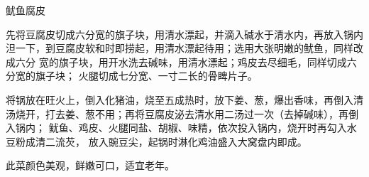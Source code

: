 \begin{recipe}{鱿鱼腐皮}

\ingredients


\preparation

\step 先将豆腐皮切成六分宽的旗子块，用清水漂起，并滴入碱水于清水内，再放入锅内
泹一下，到豆腐皮软和时即捞起，用清水漂起待用；选用大张明嫩的鱿鱼，同样改成六分
宽的旗子块，用开水洗去碱味，用清水漂起；鸡皮去尽细毛，同样切成六分宽的旗子块；
火腿切成七分宽、一寸二长的骨睥片子。

\step 将锅放在旺火上，倒入化猪油，烧至五成热时，放下姜、葱，爆出香味，再倒入清
汤烧开，打去姜、葱不用；再将豆腐皮泌去清水用二汤过一次（去掉碱味），再倒入锅内；
鱿鱼、鸡皮、火腿同盐、胡椒、味精，依次投入锅内，烧开时再勾入水豆粉成清二流芡，
放入豌豆尖，起锅时淋化鸡油盛入大窝盘内即成。

\features

此菜颜色美观，鲜嫩可口，适宜老年。

\end{recipe}

